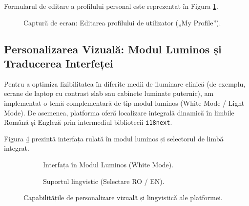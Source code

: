 Formularul de editare a profilului personal este reprezentat în Figura \ref{fig:screenshot_my_profile}.

\begin{figure}[H]
    \centering
    \color{red}
    \caption{Captură de ecran: Editarea profilului de utilizator („My Profile”).}
    \label{fig:screenshot_my_profile}
\end{figure}

\subsection{Personalizarea Vizuală: Modul Luminos și Traducerea Interfeței}
Pentru a optimiza lizibilitatea în diferite medii de iluminare clinică (de exemplu, ecrane de laptop cu contrast slab sau cabinete luminate puternic), am implementat o temă complementară de tip modul luminos (White Mode / Light Mode). De asemenea, platforma oferă localizare integrală dinamică în limbile Română și Engleză prin intermediul bibliotecii \texttt{i18next}.

Figura \ref{fig:ui_personalization} prezintă interfața rulată în modul luminos și selectorul de limbă integrat.

\begin{figure}[H]
    \centering
    \begin{subfigure}[b]{0.49\textwidth}
        \centering
        \color{red}
        \caption{Interfața în Modul Luminos (White Mode).}
        \label{fig:screenshot_light_mode}
    \end{subfigure}
    \hfill
    \begin{subfigure}[b]{0.49\textwidth}
        \centering
        \color{red}
        \caption{Suportul lingvistic (Selectare RO / EN).}
        \label{fig:screenshot_localization}
    \end{subfigure}
    \caption{Capabilitățile de personalizare vizuală și lingvistică ale platformei.}
    \label{fig:ui_personalization}
\end{figure}

